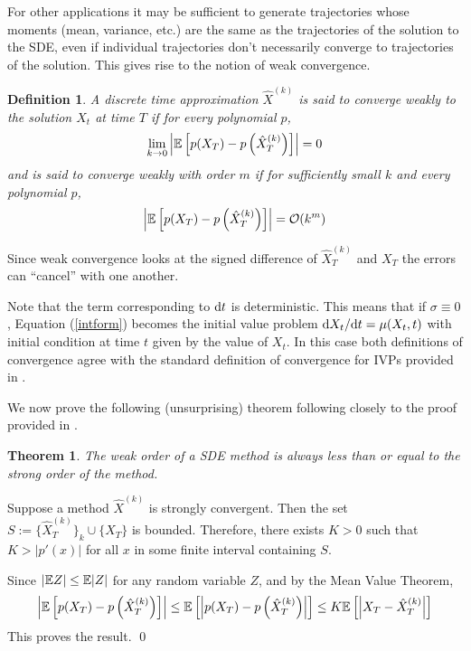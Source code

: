 \documentclass[12pt]{article}
\newtheorem*{theorem}{Theorem}
\newtheorem*{definition}{Definition}
\renewenvironment{proof}{{\bfseries Proof.}}{\qed}
\begin{document}
For other applications it may be sufficient to generate trajectories whose moments (mean, variance, etc.) are the same as the trajectories of the solution to the SDE, even if individual trajectories don't necessarily converge to trajectories of the solution. This gives rise to the notion of weak convergence.
\begin{definition}
A discrete time approximation \( \hat{X}^{(k)} \) is said to converge weakly to the solution \( X_t \) at time \( T \) if for every polynomial \( p \),
\begin{align*}
    \lim_{k\to 0} \left| \mathbb{E}\left[ p(X_T) - p\left(\hat{X}_T^{(k)}\right) \right] \right| = 0
\end{align*}
and is said to converge weakly with order \( m \) if for sufficiently small \( k \) and every polynomial \( p \),
\begin{align*}
    \left|\mathbb{E}\left[ p(X_T) - p\left(\hat{X}_T^{(k)}\right) \right] \right| = \mathcal{O}(k^m)
\end{align*}
\end{definition}

Since weak convergence looks at the signed difference of \( \hat{X}_T^{(k)} \) and \( X_T \) the errors can ``cancel'' with one another.


Note that the term corresponding to \( \mathrm{d} t \) is deterministic. This means that if \( \sigma \equiv 0 \), Equation (\ref{intform}) becomes the initial value problem \( \mathrm{d} X_t/\mathrm{d} t = \mu(X_t,t) \) with initial condition at time \( t \) given by the value of \( X_t \). In this case both definitions of convergence agree with the standard definition of convergence for IVPs provided in \cite{leveque}.

We now prove the following (unsurprising) theorem following closely to the proof provided in \cite{holmes}.
\begin{theorem}
The weak order of a SDE method is always less than or equal to the strong order of the method.
\end{theorem}
\begin{proof}
Suppose a method \( \hat{X}^{(k)} \) is strongly convergent. Then the set \( S:=\{\hat{X}_T^{(k)}\}_k\cup\{X_T\} \) is bounded.
Therefore, there exists \( K > 0 \) such that \( K > |p'(x)| \) for all \( x \) in some finite interval containing \( S \).

Since \( |\mathbb{E} Z| \leq \mathbb{E}|Z| \) for any random variable \( Z \), and by the Mean Value Theorem,
\begin{align*}
    \left|\mathbb{E}\left[ p(X_T) - p\left(\hat{X}_T^{(k)}\right) \right] \right|
    \leq \mathbb{E}\left[\left| p(X_T)  -  p\left(\hat{X}_T^{(k)}\right) \right| \right]
    \leq K \mathbb{E}\left[\left| X_T - \hat{X}_T^{(k)} \right| \right]
\end{align*}
This proves the result.
\end{proof}
\end{document}
